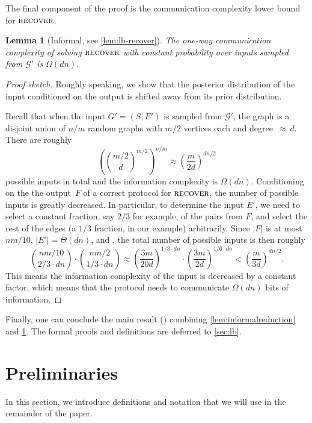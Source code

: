 \documentclass[epsfig,letter,11pt]{article}
\numberwithin{equation}{section}
\DeclareMathOperator*{\recover}{\textsc{recover}}
\newtheorem{lemma}[theorem]{Lemma}
\begin{document}
\noindent
The final component of the proof is the communication complexity lower bound for $\recover$.

\begin{lemma}[Informal, see \cref{lem:lb-recover}]
	\label{lem:informalrecover}
    The one-way communication complexity of solving $\recover$ with constant probability over inputs sampled from $\mathcal{G}'$ is $\Omega(dn)$.
\end{lemma}

\begin{proof}[Proof sketch]
    Roughly speaking, we show that the posterior distribution of the input conditioned on the output is shifted away from its prior distribution.
    
    Recall that when the input $G'=(S,E')$ is sampled from $\mathcal{G}'$, the graph is a disjoint union of $n/m$ random graphs with $m/2$ vertices each and degree~$\approx~d$. There are roughly 
    $$\left(\binom{m/2}{d}^{m/2}\right)^{n/m} \approx \left(\frac{m}{2d}\right)^{dn/2}$$ 
    possible inputs in total and the information complexity is $\Omega(dn)$. Conditioning on the the output~$F$ of  a correct protocol for $\recover$, the number of possible inputs is greatly decreased. In particular, to determine the input $E'$, we need to select a constant fraction, say $2/3$ for example, of the pairs from $F$, and select the rest of the edges (a $1/3$ fraction, in our example)  arbitrarily. Since $|F|$ is at most $nm/10$, $|E'| = \Theta(dn)$, and , the total number of possible inputs is then roughly 
    $$\binom{nm/10}{2/3 \cdot dn} \cdot \binom{nm/2}{1/3 \cdot dn} \approx \left(\frac{3m}{20d}\right)^{1/3 \cdot dn} \cdot \left(\frac{3m}{2d}\right)^{1/6 \cdot dn} < \left(\frac{m}{3d}\right)^{ dn/2}.$$
    This means the information complexity of the input is decreased by a constant factor, which means that the protocol needs to communicate $\Omega(dn)$ bits of information.
\end{proof}


\noindent
Finally, one can conclude the main result () combining \cref{lem:informalreduction} and \cref{lem:informalrecover}. The formal proofs and definitions are deferred to \cref{sec:lb}.

\section{Preliminaries}
\label{sec:prelims}

In this section, we introduce definitions and notation that we will use in the remainder of the paper.
\end{document}
